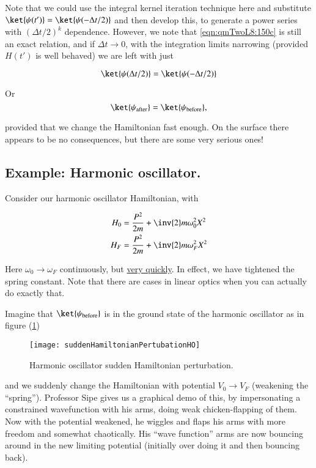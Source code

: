 Note that we could use the integral kernel iteration technique here and substitute $\ket{\psi(t')} = \ket{\psi(-\Delta t/2)}$ and then develop this, to generate a power series with $(\Delta t/2)^k$ dependence.  However, we note that \ref{eqn:qmTwoL8:150c} is still an exact relation, and if $\Delta t \rightarrow 0$, with the integration limits narrowing (provided $H(t')$ is well behaved) we are left with just

\begin{equation}\label{eqn:qmTwoL8:180}
\ket{\psi(\Delta t/2)} = \ket{\psi(-\Delta t/2)}
\end{equation}

Or
\begin{equation}\label{eqn:qmTwoL8:200}
\ket{\psi_{\text{after}}} = \ket{\psi_{\text{before}}},
\end{equation}

provided that we change the Hamiltonian fast enough.  On the surface there appears to be no consequences, but there are some very serious ones!

\subsection{Example: Harmonic oscillator.}

Consider our harmonic oscillator Hamiltonian, with

\begin{align}\label{eqn:qmTwoL8:220}
H_0 &= \frac{P^2}{2m} + \inv{2} m \omega_0^2 X^2 \\
H_F &= \frac{P^2}{2m} + \inv{2} m \omega_F^2 X^2
\end{align}

Here $\omega_0 \rightarrow \omega_F$ continuously, but \underline{very quickly}.  In effect, we have tightened the spring constant.  Note that there are cases in linear optics when you can actually do exactly that.

Imagine that $\ket{\psi_{\text{before}}}$ is in the ground state of the harmonic oscillator as in figure (\ref{fig:qmTwoL8:suddenHamiltonianPertubationHO})

\begin{figure}[htp]
\centering
\texttt{[image: suddenHamiltonianPertubationHO]}
\caption{Harmonic oscillator sudden Hamiltonian perturbation.}\label{fig:qmTwoL8:suddenHamiltonianPertubationHO}
\end{figure}

and we suddenly change the Hamiltonian with potential $V_0 \rightarrow V_F$ (weakening the ``spring'').  Professor Sipe gives us a graphical demo of this, by impersonating a constrained wavefunction with his arms, doing weak chicken-flapping of them.  Now with the potential weakened, he wiggles and flaps his arms with more freedom and somewhat chaotically.  His ``wave function'' arms are now bouncing around in the new limiting potential (initially over doing it and then bouncing back).

